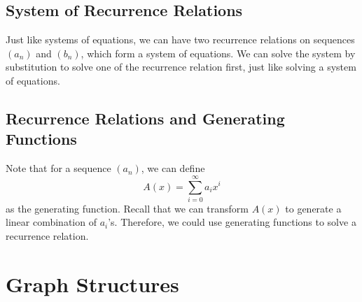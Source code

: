 \documentclass[math]{amznotes}
\theoremstyle{remark}
\begin{document}
\section{System of Recurrence Relations}
Just like systems of equations, we can have two recurrence relations on sequences $(a_n)$ and $(b_n)$, which form a system of equations. We can solve the system by substitution to solve one of the recurrence relation first, just like solving a system of equations.
\section{Recurrence Relations and Generating Functions}
Note that for a sequence $(a_n)$, we can define
\begin{equation*}
    A(x) = \sum_{i = 0}^{\infty}a_ix^i
\end{equation*}
as the generating function. Recall that we can transform $A(x)$ to generate a linear combination of $a_i$'s. Therefore, we could use generating functions to solve a recurrence relation.

\chapter{Graph Structures}
\end{document}
